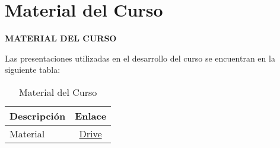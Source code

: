 \chapter{Material del Curso}
\newpage

\pagestyle{empty} 


\vspace{1cm}
\centering
\textbf{MATERIAL DEL CURSO}
\vspace{0.5cm}

Las presentaciones utilizadas en el desarrollo del curso se encuentran en la siguiente tabla:

\begin{table}[h]
\centering
	\caption{Material del Curso}
	\begin{tabular}{|l|c|}
	\hline
	\textbf{Descripción} & 
	\textbf{Enlace} 
	\\ \hline
	Material &
	\href{https://drive.google.com/drive/folders/18yP-CM04srt3JQ-4ImnSsoB3DI4GWFAp?usp=sharing}{Drive}
	\\ \hline
	
	\end{tabular}
\end{table}
